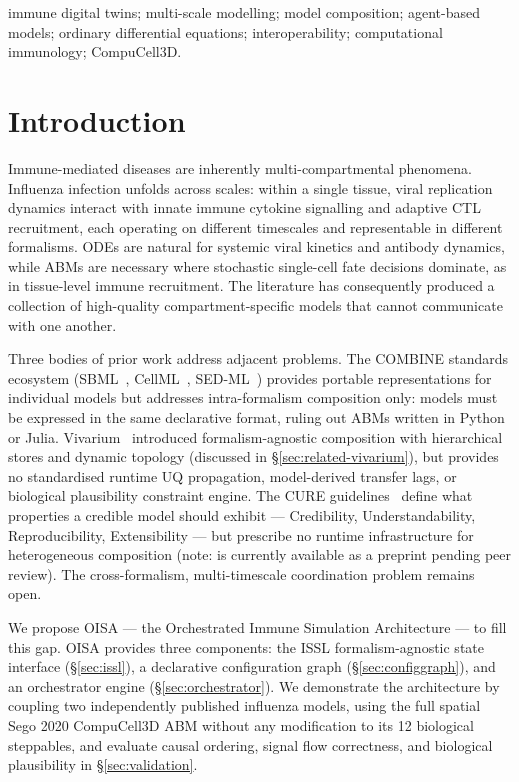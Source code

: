 \documentclass[conference,letterpaper,10pt]{IEEEtran}
\begin{document}
\begin{IEEEkeywords}
immune digital twins; multi-scale modelling; model composition;
agent-based models; ordinary differential equations; interoperability;
computational immunology; CompuCell3D.
\end{IEEEkeywords}

\section{Introduction}
Immune-mediated diseases are inherently multi-compartmental phenomena.
Influenza infection unfolds across scales: within a single tissue, viral
replication dynamics interact with innate immune cytokine signalling and
adaptive CTL recruitment, each operating on different timescales and
representable in different formalisms. ODEs are natural for systemic
viral kinetics and antibody dynamics, while ABMs are necessary where
stochastic single-cell fate decisions dominate, as in tissue-level
immune recruitment. The literature has consequently produced a
collection of high-quality compartment-specific models that cannot
communicate with one another.

Three bodies of prior work address adjacent problems. The COMBINE
standards ecosystem (SBML~\cite{hucka2015sbml},
CellML~\cite{clerx2020cellml}, SED-ML~\cite{waltemath2011sedml})
provides portable representations for individual models but addresses
intra-formalism composition only: models must be expressed in the same
declarative format, ruling out ABMs written in Python or Julia.
Vivarium~\cite{agmon2022vivarium} introduced formalism-agnostic
composition with hierarchical stores and dynamic topology (discussed in
\S\ref{sec:related-vivarium}), but provides no standardised runtime UQ
propagation, model-derived transfer lags, or biological plausibility
constraint engine. The CURE guidelines~\cite{sauro2025cure} define what
properties a credible model should exhibit --- Credibility,
Understandability, Reproducibility, Extensibility --- but prescribe no
runtime infrastructure for heterogeneous composition (note:
\cite{sauro2025cure} is currently available as a preprint pending peer
review). The cross-formalism, multi-timescale coordination problem
remains open.

We propose OISA --- the Orchestrated Immune Simulation Architecture ---
to fill this gap. OISA provides three components: the ISSL
formalism-agnostic state interface (\S\ref{sec:issl}), a declarative
configuration graph (\S\ref{sec:configgraph}), and an orchestrator
engine (\S\ref{sec:orchestrator}). We demonstrate the architecture by
coupling two independently published influenza models, using the full
spatial Sego 2020 CompuCell3D ABM without any modification to its 12
biological steppables, and evaluate causal ordering, signal flow
correctness, and biological plausibility in \S\ref{sec:validation}.
\end{document}
